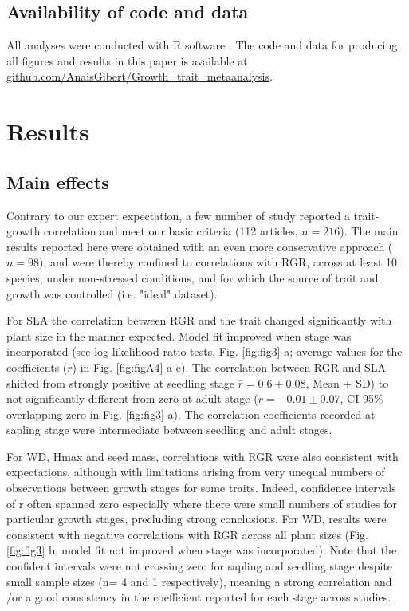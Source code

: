 \documentclass[a4paper,11pt]{article}
\newcommand{\smurl}[1]{\url{#1}}
\begin{document}
\subsection*{Availability of code and data}\label{code}

All analyses were conducted with R software \citep{Ralanguageanden:2014wf}. The code and data for producing all figures and results in this paper is available at \smurl{github.com/AnaisGibert/Growth\_trait\_metaanalysis}.

\section*{Results}\label{results}

\subsection*{Main effects}

Contrary to our expert expectation, a few number of study reported a trait-growth correlation and meet our basic criteria (112 articles, $n = 216$). The main results reported here were obtained with an even more conservative approach ($n = 98$), and were thereby confined to correlations with RGR, across at least 10 species, under non-stressed conditions, and for which the source of trait and growth was controlled (i.e. "ideal" dataset). 

For SLA the correlation between RGR and the trait changed significantly with plant size in the manner expected. Model fit improved when stage was incorporated (see log likelihood ratio tests, Fig. \ref{fig:fig3} a; average values for the coefficients ($\bar{r}$) in Fig. \ref{fig:figA4} a-e). The correlation between RGR and SLA shifted from strongly positive at seedling stage $\bar{r}=0.6 \pm 0.08$, Mean $\pm$ SD) to not significantly different from zero at adult stage ($\bar{r}= -0.01 \pm 0.07$, CI 95\% overlapping zero in Fig. \ref{fig:fig3} a). The correlation coefficients recorded at sapling stage were intermediate between seedling and adult stages. 

For WD, Hmax and seed mass, correlations with RGR were also consistent with expectations, although with limitations arising from very unequal numbers of observations between growth stages for some traits. Indeed, confidence intervals of r often spanned zero especially where there were small numbers of studies for particular growth stages, precluding strong conclusions. 
For WD, results were consistent with negative correlations with RGR across all plant sizes (Fig. \ref{fig:fig3} b, model fit not improved when stage was incorporated). Note that the confident intervals were not crossing zero for sapling and seedling stage despite small sample sizes (n= 4 and 1 respectively), meaning a strong correlation and /or a good consistency in the coefficient reported for each stage across studies.
\end{document}

